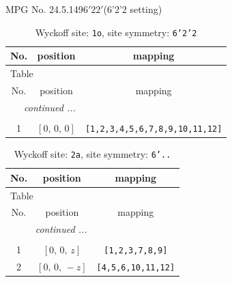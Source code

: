 \documentclass[fleqn,8pt]{jsarticle}
\begin{document}
\setcounter{MaxMatrixCols}{32}

\renewcommand{\tablename}{Table~}
\renewcommand{\figurename}{Figure~}
\begin{center}
\LARGE
MPG No. 24.5.149\quad$6'22'$\quad(6'2'2 setting)
\end{center}
\renewcommand{\arraystretch}{1.2}
\begin{longtable}{ccc}
\caption{Wyckoff site: {\tt 1o}, site symmetry: {\tt 6'2'2}}
 \\
 \hline \hline
No. & position & mapping \\ \hline \endfirsthead

\multicolumn{2}{l}{\tablename\ \thetable{}} \\
 \hline \hline
No. & position & mapping \\ \hline \endhead

 \hline \hline
\multicolumn{2}{r}{\footnotesize\it continued ...} \\ \endfoot

 \hline \hline
\multicolumn{2}{r}{} \\ \endlastfoot

1 & $\left[ 0,\, 0,\, 0 \right]$ & {\tt [1,2,3,4,5,6,7,8,9,10,11,12]} \\
\end{longtable}
\renewcommand{\arraystretch}{1.2}
\begin{longtable}{ccc}
\caption{Wyckoff site: {\tt 2a}, site symmetry: {\tt 6'..}}
 \\
 \hline \hline
No. & position & mapping \\ \hline \endfirsthead

\multicolumn{2}{l}{\tablename\ \thetable{}} \\
 \hline \hline
No. & position & mapping \\ \hline \endhead

 \hline \hline
\multicolumn{2}{r}{\footnotesize\it continued ...} \\ \endfoot

 \hline \hline
\multicolumn{2}{r}{} \\ \endlastfoot

1 & $\left[ 0,\, 0,\, z \right]$ & {\tt [1,2,3,7,8,9]} \\ \hline
2 & $\left[ 0,\, 0,\, - z \right]$ & {\tt [4,5,6,10,11,12]} \\
\end{longtable}
\renewcommand{\arraystretch}{1.2}
\end{document}
